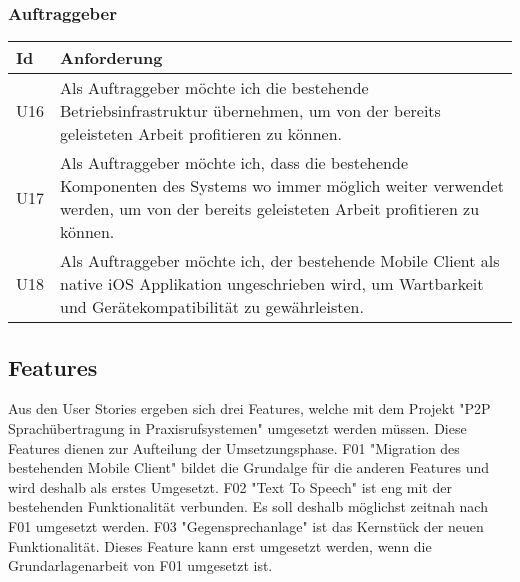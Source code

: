 \subsubsection*{Auftraggeber}

\begin{table}[h]
    \centering
    \begin{tabular}{|l|p{15cm}|}
        \hline
        \textbf{Id} & \textbf{Anforderung}                                                                                                                                                             \\
        \hline
        U16           & Als Auftraggeber möchte ich die bestehende Betriebsinfrastruktur übernehmen, um von der bereits geleisteten Arbeit profitieren zu können.                                        \\
        \hline
        U17           & Als Auftraggeber möchte ich, dass die bestehende Komponenten des Systems wo immer möglich weiter verwendet werden, um von der bereits geleisteten Arbeit profitieren zu können. \\
        \hline
        U18           & Als Auftraggeber möchte ich, der bestehende Mobile Client als native iOS Applikation ungeschrieben wird, um Wartbarkeit und Gerätekompatibilität zu gewährleisten. \\
        \hline
    \end{tabular}\label{tab:userstories3}
\end{table}

\subsection*{Features}

Aus den User Stories ergeben sich drei Features, welche mit dem Projekt "P2P Sprachübertragung in Praxisrufsystemen" umgesetzt werden müssen.
Diese Features dienen zur Aufteilung der Umsetzungsphase.
F01 "Migration des bestehenden Mobile Client" bildet die Grundalge für die anderen Features und wird deshalb als erstes Umgesetzt.
F02 "Text To Speech" ist eng mit der bestehenden Funktionalität verbunden.
Es soll deshalb möglichst zeitnah nach F01 umgesetzt werden.
F03 "Gegensprechanlage" ist das Kernstück der neuen Funktionalität.
Dieses Feature kann erst umgesetzt werden, wenn die Grundarlagenarbeit von F01 umgesetzt ist.

